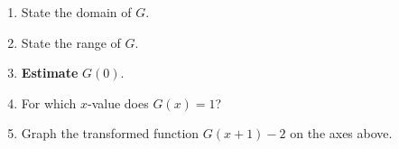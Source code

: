 \documentclass[12pt]{article}
\renewcommand{\emph}[1]{\textsf{\textbf{#1}}}
\newcounter{probcount}
\newcounter{subprobcount}
\newenvironment{subproblems}{%
\begin{enumerate}%
\setcounter{enumi}{\value{subprobcount}}%
\renewcommand{\theenumi}{\emph{\alph{enumi}}}}%
{\setcounter{subprobcount}{\value{enumi}}\end{enumerate}}
\begin{document}
\begin{subproblems}
\item State the domain of $G$. \hfill \underline{\hspace{2in}} \\
  \vfill
\item State the range of $G$. \hfill \underline{\hspace{2in}} \\
  \vfill
\item \textbf{Estimate} $G(0)$. \hfill \underline{\hspace{2in}} \\
  \vfill
\item For which $x$-value does $G(x)=1$? \hfill \underline{\hspace{2in}} \\
  \vfill
\item Graph the transformed function $G(x+1)-2$ on the axes above. \\
  \vfill
\end{subproblems}
\end{document}
